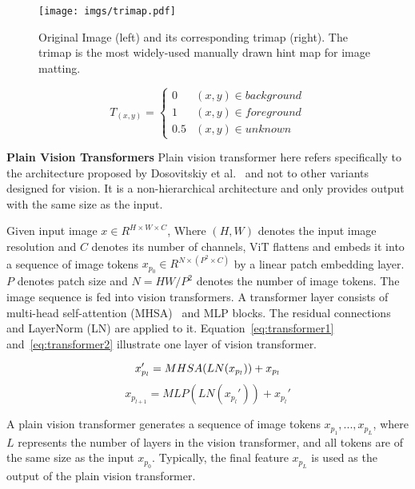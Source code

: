 \documentclass[10pt,twocolumn,letterpaper]{article}
\begin{document}
\begin{figure}
    \centering
    \texttt{[image: imgs/trimap.pdf]}
    \caption{Original Image (left) and its corresponding trimap (right). The trimap is the most widely-used manually drawn hint map for image matting.}
    \label{fig:trimap}
\end{figure}

\begin{equation}
    T_{(x,y)}=
    {\begin{cases}
    0&           \text{$(x,y) \in background$}\\
    1&           \text{$(x,y) \in foreground$}\\
    0.5&         \text{$(x,y) \in unknown$}
    \end{cases}}
\end{equation}

\textbf{Plain Vision Transformers}
Plain vision transformer here refers specifically to the architecture proposed by Dosovitskiy et al.~\cite{vit} and not to other variants designed for vision. It is a non-hierarchical architecture and only provides output with the same size as the input.

Given input image $x\in R^{H\times W\times C}$, Where $(H, W)$ denotes the input image resolution and $C$ denotes its number of channels, ViT flattens and embeds it into a sequence of image tokens $x_{p_0}\in R^{N\times(P^2\times C)}$ by a linear patch embedding layer. $P$ denotes patch size and $N=HW/P^2$ denotes the number of image tokens. The image sequence is fed into vision transformers. A transformer layer consists of multi-head self-attention (MHSA)~\cite{NIPS2017_3f5ee243} and MLP blocks. The residual connections and LayerNorm (LN) are applied to it. Equation~\eqref {eq:transformer1} and~\eqref{eq:transformer2} illustrate one layer of vision transformer.

\begin{equation}
    x_{p_l}' = MHSA(LN(x_{p_l})) + x_{p_l}\\
    \label{eq:transformer1}
\end{equation}
\begin{equation}
    \label{eq:transformer2}
x_{p_{l+1}} = MLP(LN(x_{p_l}')) + x_{p_l}'
\end{equation}

A plain vision transformer generates a sequence of image tokens ${x_{p_1}, ..., x_{p_L}}$, where $L$ represents the number of layers in the vision transformer, and all tokens are of the same size as the input $x_{p_0}$. Typically, the final feature $x_{p_L}$ is used as the output of the plain vision transformer.
\end{document}

